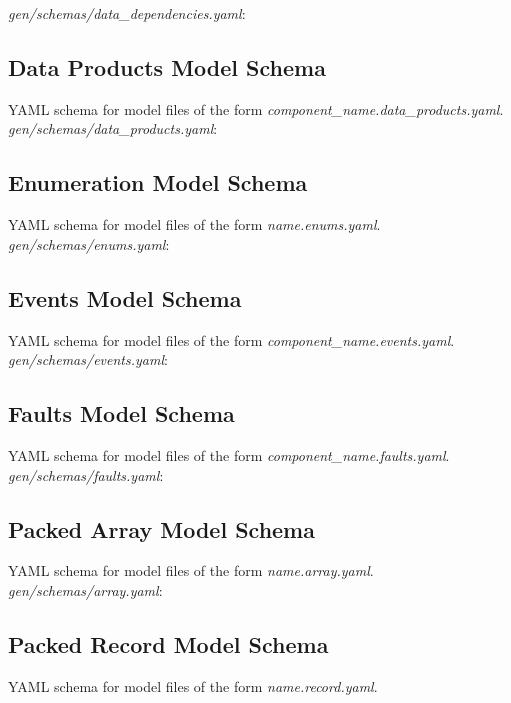 \begin{appendices}
\textit{gen/schemas/data\_dependencies.yaml}:

\subsection{Data Products Model Schema}
YAML schema for model files of the form \textit{component\_name.data\_products.yaml}. \\

\textit{gen/schemas/data\_products.yaml}:

\subsection{Enumeration Model Schema}
YAML schema for model files of the form \textit{name.enums.yaml}. \\

\textit{gen/schemas/enums.yaml}:

\subsection{Events Model Schema}
YAML schema for model files of the form \textit{component\_name.events.yaml}. \\

\textit{gen/schemas/events.yaml}:

\subsection{Faults Model Schema}
YAML schema for model files of the form \textit{component\_name.faults.yaml}. \\

\textit{gen/schemas/faults.yaml}: \\


\subsection{Packed Array Model Schema}
YAML schema for model files of the form \textit{name.array.yaml}. \\

\textit{gen/schemas/array.yaml}:

\subsection{Packed Record Model Schema}
YAML schema for model files of the form \textit{name.record.yaml}. \\


\end{appendices}
